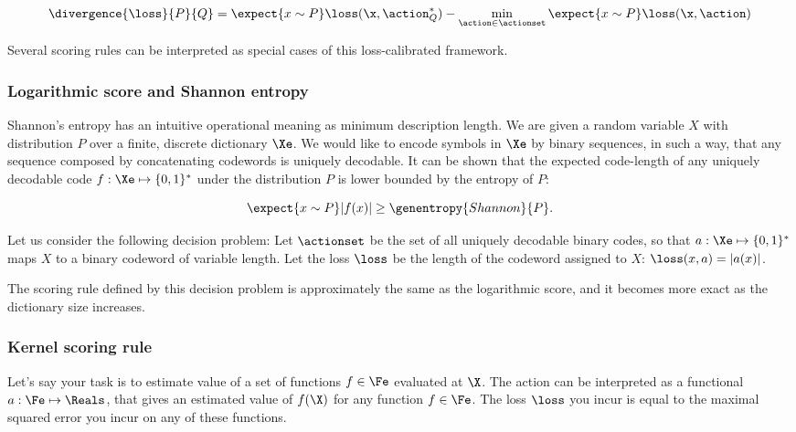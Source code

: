 \begin{align}
	\divergence{\loss}{P}{Q} = \expect{x\sim P} \loss(\x,\action^{*}_{Q}) - \min_{\action \in \actionset}\expect{x\sim P} \loss(\x,\action)
\end{align}

Several scoring rules can be interpreted as special cases of this loss-calibrated framework.

\subsubsection{Logarithmic score and Shannon entropy}

Shannon's entropy has an intuitive operational meaning as minimum description length. We are given a random variable $X$ with distribution $P$ over a finite, discrete dictionary $\Xe$. We would like to encode symbols in $\Xe$ by binary sequences, in such a way, that any sequence composed by concatenating codewords is uniquely decodable. It can be shown that the expected code-length of any uniquely decodable code $f:\Xe\mapsto\{0,1\}^{*}$ under the distribution $P$ is lower bounded by the entropy of $P$:

\begin{equation}
	\expect{x \sim P} \vert f(x) \vert \geq \genentropy{Shannon}{P}.
\end{equation}


Let us consider the following decision problem: Let $\actionset$ be the set of all uniquely decodable binary codes, so that $a:\Xe\mapsto\{0,1\}^{*}$ maps $X$ to a binary codeword of variable length. Let the loss $\loss$ be the length of the codeword assigned to $X$: $\loss(x,a) = \vert a(x)\vert$.

The scoring rule defined by this decision problem is approximately the same as the logarithmic score, and it becomes more exact as the dictionary size increases.

\subsubsection{Kernel scoring rule}

Let's say your task is to estimate value of a set of functions $f\in{\Fe}$ evaluated at $\X$. The action can be interpreted as a functional $a:\Fe\mapsto\Reals$, that gives an estimated value of $f(\X)$ for any function $f\in\Fe$. The loss $\loss$ you incur is equal to the maximal squared error you incur on any of these functions.


